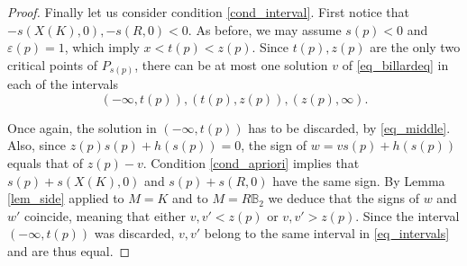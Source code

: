 \documentclass[10pt,a4paper]{amsart}
\def \B{\mathbb B}
\def \e{\varepsilon}
\begin{document}
\begin{proof}
	Finally let us consider condition \eqref{cond_interval}.
	First notice that $-s(X(K),0), -s(R,0) < 0$.
	As before, we may assume $s(p) < 0$ and $\e(p) = 1$, which imply $x < t(p) < z(p)$.
	Since $t(p), z(p)$ are the only two critical points of $P_{s(p)} $, there can be at most one solution $v$ of \eqref{eq_billardeq} in each of the intervals
	\begin{equation}
		\label{eq_intervals}
		(-\infty, t(p)), (t(p), z(p)), (z(p), \infty).
	\end{equation}

	Once again, the solution in $(-\infty, t(p))$ has to be discarded, by \eqref{eq_middle}.
	Also, since $z(p) s(p) + h(s(p)) = 0$, the sign of $w = v s(p) + h(s(p))$ equals that of $z(p) - v$.
	Condition \eqref{cond_apriori} implies that $s(p) + s(X(K),0)$ and $s(p) + s(R,0)$ have the same sign.
	By Lemma \ref{lem_side} applied to $M=K$ and to $M=R \B_2$ we deduce that the signs of $w$ and $w'$ coincide, meaning that either $v,v' < z(p)$ or $v,v' > z(p)$.
	Since the interval $(-\infty, t(p))$ was discarded, $v, v'$ belong to the same interval in \eqref{eq_intervals} and are thus equal.
\end{proof}
\end{document}
